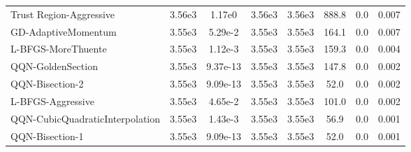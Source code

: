 \documentclass{article}
\begin{document}
\begin{table}[htbp]
{\begin{tabular}{p{2.5cm}*{7}{c}}
Trust Region-Aggressive & 3.56e3 & 1.17e0 & 3.56e3 & 3.56e3 & 888.8 & 0.0 & 0.007 \\
GD-AdaptiveMomentum & 3.55e3 & 5.29e-2 & 3.55e3 & 3.55e3 & 164.1 & 0.0 & 0.007 \\
L-BFGS-MoreThuente & 3.55e3 & 1.12e-3 & 3.55e3 & 3.55e3 & 159.3 & 0.0 & 0.004 \\
QQN-GoldenSection & 3.55e3 & 9.37e-13 & 3.55e3 & 3.55e3 & 147.8 & 0.0 & 0.002 \\
QQN-Bisection-2 & 3.55e3 & 9.09e-13 & 3.55e3 & 3.55e3 & 52.0 & 0.0 & 0.002 \\
L-BFGS-Aggressive & 3.55e3 & 4.65e-2 & 3.55e3 & 3.55e3 & 101.0 & 0.0 & 0.002 \\
QQN-CubicQuadraticInterpolation & 3.55e3 & 1.43e-3 & 3.55e3 & 3.55e3 & 56.9 & 0.0 & 0.001 \\
QQN-Bisection-1 & 3.55e3 & 9.09e-13 & 3.55e3 & 3.55e3 & 52.0 & 0.0 & 0.001 \\
\bottomrule
\end{tabular}
}
\end{table}
\end{document}
